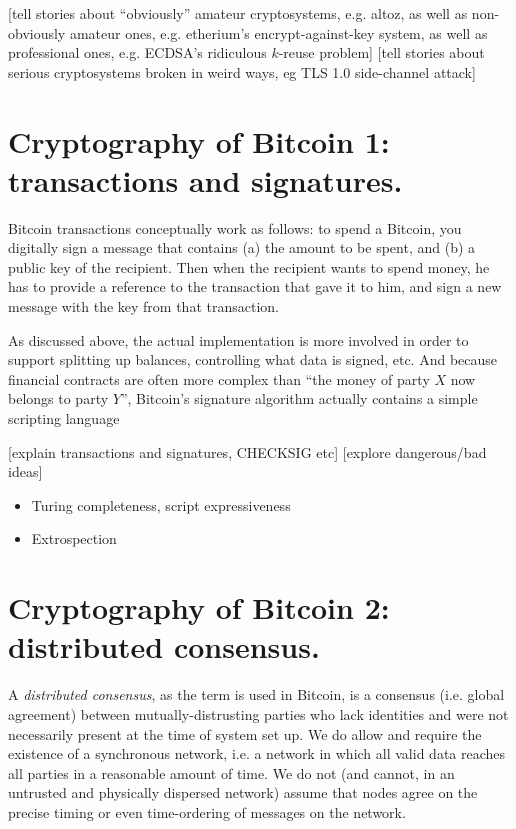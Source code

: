 \documentclass[letterpaper]{article}
\begin{document}
[tell stories about ``obviously'' amateur cryptosystems, e.g. altoz, as well
as non-obviously amateur ones, e.g. etherium's encrypt-against-key system,
as well as professional ones, e.g. ECDSA's ridiculous $k$-reuse problem]
[tell stories about serious cryptosystems broken in weird ways, eg TLS 1.0 side-channel attack]

\section{Cryptography of Bitcoin 1: transactions and signatures. \label{txes}}

Bitcoin transactions conceptually work as follows: to spend a Bitcoin, you
digitally sign a message that contains (a) the amount to be spent, and (b)
a public key of the recipient. Then when the recipient wants to spend money,
he has to provide a reference to the transaction that gave it to him, and
sign a new message with the key from that transaction.

As discussed above, the actual implementation is more involved in order to
support splitting up balances, controlling what data is signed, etc. And
because financial contracts are often more complex than ``the money of
party $X$ now belongs to party $Y$'', Bitcoin's signature algorithm actually
contains a simple scripting language

[explain transactions and signatures, CHECKSIG etc]
[explore dangerous/bad ideas]
\begin{itemize}
\item Turing completeness, script expressiveness
\item Extrospection
\end{itemize}

\section{Cryptography of Bitcoin 2: distributed consensus.\label{consensus}}

A \emph{distributed consensus}, as the term is used in Bitcoin, is a consensus (i.e.
global agreement) between mutually-distrusting parties who lack identities and were
not necessarily present at the time of system set up. We do allow and require the
existence of a synchronous network, i.e. a network in which all valid data reaches
all parties in a reasonable amount of time. We do not (and cannot, in an untrusted
and physically dispersed network) assume that nodes agree on the precise timing or
even time-ordering of messages on the network.
\end{document}
